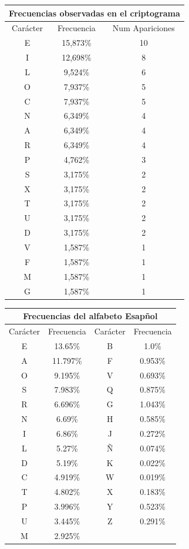 \documentclass{article}
\begin{document}
\begin{enumerate}
\begin{tabular}{|c|c|c|}
\hline 
\multicolumn{3}{|c|}{Frecuencias observadas en el criptograma} \\ \hline
Carácter & Frecuencia & Num Apariciones \\ \hline 
E & 15,873\% & 10  \\ \hline
I & 12,698\% & 8  \\ \hline
L & 9,524\% & 6  \\ \hline
O & 7,937\% & 5  \\ \hline
C & 7,937\% & 5  \\ \hline
N & 6,349\% & 4  \\ \hline
A & 6,349\% & 4 \\ \hline
R & 6,349\% & 4  \\ \hline
P & 4,762\% & 3  \\ \hline
S & 3,175\% & 2  \\ \hline
X & 3,175\% & 2 \\ \hline
T & 3,175\% & 2  \\ \hline
U & 3,175\% & 2 \\ \hline
D & 3,175\% & 2 \\ \hline
V & 1,587\% & 1 \\ \hline
F & 1,587\% & 1 \\  \hline
M & 1,587\% & 1 \\  \hline
G & 1,587\% & 1 \\  \hline

\end{tabular}
\label{tabla:sencilla}


\begin{tabular}{|c|c|c|c|}
\hline 
\multicolumn{4}{|c|}{Frecuencias del alfabeto Esapñol} \\ \hline
Carácter & Frecuencia & Carácter & Frecuencia\\ \hline
E & 13.65\%   & B & 1.0\% \\ \hline
A & 11.797\% & F & 0.953\% \\ \hline
O & 9.195\%  & V & 0.693\% \\ \hline
S & 7.983\%  & Q & 0.875\% \\ \hline
R & 6.696\%& G & 1.043\% \\ \hline
N & 6.69\% & H & 0.585\% \\ \hline
I & 6.86\% & J & 0.272\% \\ \hline
L & 5.27\% & Ñ & 0.074\% \\ \hline
D & 5.19\% & K & 0.022\% \\ \hline
C & 4.919\% & W & 0.019\% \\ \hline
T & 4.802\% & X & 0.183\% \\ \hline
P & 3.996\% & Y & 0.523\% \\ \hline
U & 3.445\% & Z & 0.291\% \\ \hline
M & 2.925\% &   & \\
\hline
\end{tabular}
\label{tabla:sencilla}


\end{enumerate}
\end{document}
